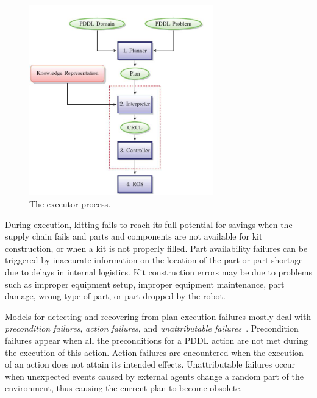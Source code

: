 \begin{figure}[ht]
\begin{center}
\includegraphics[width=8cm]{images/executor.jpg}
\caption{The executor process.}
\label{fig:executor}
\end{center}
\end{figure}

During execution, kitting fails to reach its full potential for savings when the supply chain fails and parts and components are not available for kit construction, or when a kit is not properly filled. Part availability failures can be triggered by inaccurate information on the location of the part or part shortage due to delays in internal logistics. Kit construction errors may be due to problems such as improper equipment setup, improper equipment maintenance, part damage, wrong type of part, or part dropped by the robot.


Models for detecting and recovering from plan execution failures mostly deal with \textit{precondition failures}, \textit{action failures}, and \textit{unattributable failures}~\cite{Myers1998}. Precondition failures appear when all the preconditions for a PDDL action are not met during the execution of this action. Action failures are encountered when the execution of an action does not attain its intended effects. Unattributable failures occur when unexpected events caused by external agents change a random part of the environment, thus causing the current plan to become obsolete.

